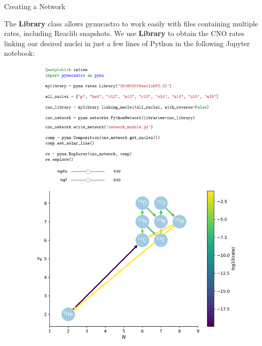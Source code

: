 \documentclass[final]{beamer}
\newlength{\onecolwid}
\newlength{\twocolwid}
\begin{document}
\begin{frame}[t]
\begin{columns}[t]
\begin{column}{\twocolwid}
\begin{columns}[t,totalwidth=\twocolwid] %

\begin{column}{\onecolwid}\vspace{-.6in} %


\begin{block}{Creating a Network}

The \textbf{Library} class allows pynucastro to work easily with files
containing multiple rates, including Reaclib snapshots. We use
\textbf{Library} to obtain the CNO rates linking our desired nuclei in
just a few lines of Python in the following Jupyter notebook:

\begin{figure}
\includegraphics[width=1.1\linewidth]{figures/library-examples-nuclei.png}
\end{figure}


\end{block}
\end{column}
\end{columns}
\end{column}
\end{columns}
\end{frame}
\end{document}
